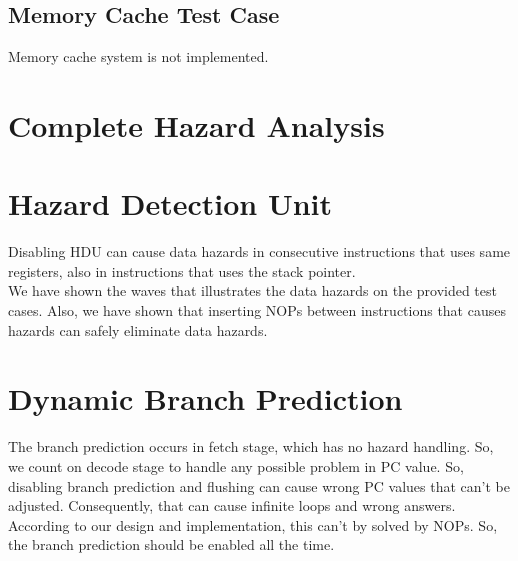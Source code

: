 \subsection{Memory Cache Test Case}
Memory cache system is not implemented. 

\section{Complete Hazard Analysis}

\section{Hazard Detection Unit}

Disabling HDU can cause data hazards in consecutive instructions that uses same registers, also in instructions that uses the stack pointer. \\
We have shown the waves that illustrates the data hazards on the provided test cases. Also, we have shown that inserting NOPs between instructions that causes hazards can safely eliminate data hazards.

\section{Dynamic Branch Prediction}
The branch prediction occurs in fetch stage, which has no hazard handling. So, we count on decode stage to handle any possible problem in PC value. So, disabling branch prediction and flushing can cause wrong PC values that can't be adjusted. Consequently, that can cause infinite loops and wrong answers. \\
According to our design and implementation, this can't by solved by NOPs. So, the branch prediction should be enabled all the time.
